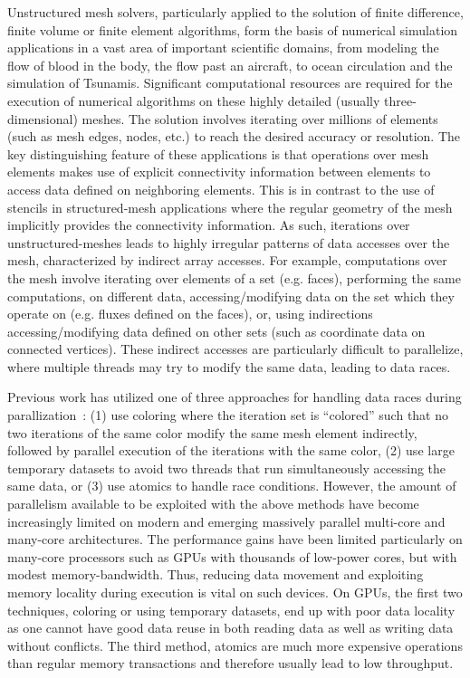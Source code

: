 
\noindent Unstructured mesh solvers, particularly applied to the solution of 
finite difference, finite volume or finite element algorithms, form the basis 
of numerical simulation applications in a vast area of important scientific 
domains, from modeling the flow of blood in the body, the flow past an aircraft, 
to ocean circulation and the simulation of Tsunamis. Significant computational 
resources are required for the execution of numerical algorithms on these highly 
detailed (usually three-dimensional) meshes. The solution involves iterating 
over millions of elements (such as mesh edges, nodes, etc.) to reach the desired 
accuracy or resolution. The key distinguishing feature of these applications is 
that operations over mesh elements makes use of explicit connectivity 
information between elements to access data defined on neighboring elements. 
This is in contrast to the use of stencils in structured-mesh applications where 
the regular geometry of the mesh implicitly provides the connectivity 
information. As such, iterations over unstructured-meshes leads to highly 
irregular patterns of data accesses over the mesh, characterized by indirect 
array accesses. For example, computations over the mesh involve iterating over 
elements of a set (e.g. faces), performing the same computations, on different 
data, accessing/modifying data on the set which they operate on (e.g. fluxes 
defined on the faces), or, using indirections accessing/modifying data defined 
on other sets (such as coordinate data on connected vertices). These indirect 
accesses are particularly difficult to parallelize, where multiple threads may 
try to modify the same data, leading to data races. 

Previous work has utilized one of three approaches for handling data races 
during parallization~\cite{LULESH:spec,miniaero}: (1) use coloring where the 
iteration set is ``colored'' such that no two iterations of the same color 
modify the same mesh element indirectly, followed by parallel execution of the 
iterations with the same color, (2) use large temporary datasets to avoid two 
threads that run simultaneously accessing the same data, or (3) use atomics to 
handle race conditions. However, the amount of parallelism available to be 
exploited with the above methods have become increasingly limited on modern and 
emerging massively parallel multi-core and many-core architectures. The 
performance gains have been limited particularly on many-core processors such as 
GPUs with thousands of low-power cores, but with modest memory-bandwidth. 
Thus, reducing data movement and exploiting memory locality during execution is 
vital on such devices. On GPUs, the first two techniques, coloring or using 
temporary datasets, end up with poor data locality as one cannot have good data 
reuse in both reading data as well as writing data without conflicts. The third 
method, atomics are much more expensive operations than regular memory 
transactions and therefore usually lead to low throughput. 

